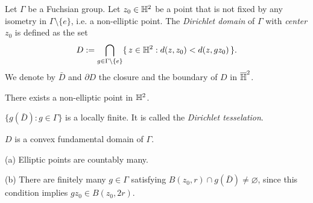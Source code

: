 \documentclass[a4paper]{article}
\begin{document}
\begin{prb}
Let $\Gamma$ be a Fuchsian group.
Let $z_0\in\mathbb{H}^2$ be a point that is not fixed by any isometry in $\Gamma\setminus\{e\}$, i.e. a non-elliptic point.
The \emph{Dirichlet domain} of $\Gamma$ with \emph{center} $z_0$ is defined as the set
\[D:=\bigcap_{g\in\Gamma\setminus\{e\}}\{\,z\in\mathbb{H}^2:d(z,z_0)<d(z,gz_0)\,\}.\]
We denote by $\bar D$ and $\partial D$ the closure and the boundary of $D$ in $\overline{\mathbb{H}}^2$.
\begin{parts}
\item There exists a non-elliptic point in $\mathbb{H}^2$.
\item $\{g(\bar D):g\in\Gamma\}$ is a locally finite. It is called the \emph{Dirichlet tesselation}.
\item $D$ is a convex fundamental domain of $\Gamma$.
\end{parts}
\end{prb}
\begin{pf}
(a)
Elliptic points are countably many.

(b)
There are finitely many $g\in\Gamma$ satisfying $B(z_0,r)\cap g(\bar D)\ne\varnothing$, since this condition implies $gz_0\in B(z_0,2r)$.
\end{pf}
\end{document}
